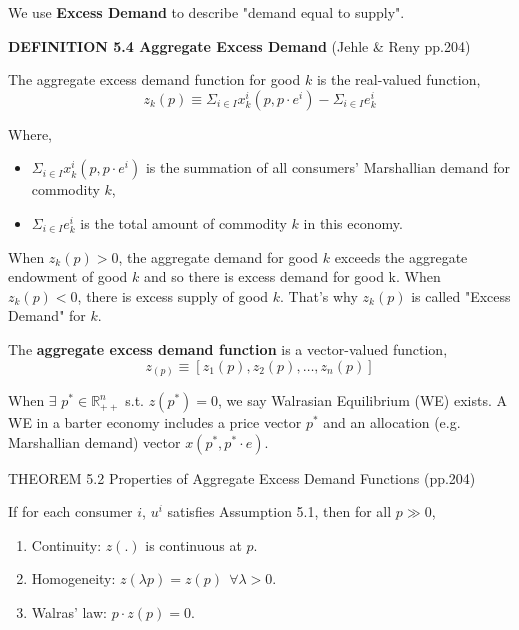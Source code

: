 \documentclass{article}
\newcommand{\R}{\mathbb{R}}
\begin{document}
\begin{mdframed}[backgroundcolor=blue!20,linecolor=white]
We use \textbf{Excess Demand} to describe "demand equal to supply".
\vspace{2mm}

\textbf{DEFINITION 5.4 Aggregate Excess Demand} (Jehle \& Reny pp.204)

The aggregate excess demand function for good $k$ is the real-valued function,
$$z_k(p) \equiv \Sigma_{i \in I } x^i_k(p,p\cdot e^i) - \Sigma_{i \in I } e^i_k$$

Where,
\begin{itemize}
\item $\Sigma_{i \in I } x^i_k(p,p\cdot e^i)$ is the summation of all consumers' Marshallian demand for commodity $k$,
\item $\Sigma_{i \in I } e^i_k$ is the total amount of commodity $k$ in this economy.
\end{itemize}

When $z_k(p) > 0$, the aggregate demand for good $k$ exceeds the aggregate endowment of good $k$ and so there is excess demand for good k. When $z_k(p) < 0$, there is excess supply of good $k$. That's why $z_k(p)$ is called "Excess Demand" for $k$.
\vspace{2mm}

The \textbf{aggregate excess demand function} is a vector-valued function,
$$z_(p) \equiv [z_1(p),z_2(p),\dots,z_n(p)]$$

\vspace{2mm}


When $\exists$ $p^* \in \R^n_{++}$ s.t. $z(p^*) = 0$, we say
Walrasian Equilibrium (WE) exists. A WE in a barter economy includes a price vector $p^*$ and an allocation (e.g. Marshallian demand) vector $x(p^*,p^*\cdot e)$.

\vspace{4mm}

THEOREM 5.2 Properties of Aggregate Excess Demand Functions (pp.204)

If for each consumer $i$, $u^i$ satisfies Assumption 5.1, then for all $p \gg 0$,


\begin{enumerate}
\item Continuity: $z(.)$ is continuous at $p$.
\item Homogeneity: $z(\lambda p) = z(p) \ \ \forall \lambda > 0$.
\item Walras' law: $p \cdot z(p) = 0$.
\end{enumerate}
\end{mdframed}
\end{document}

